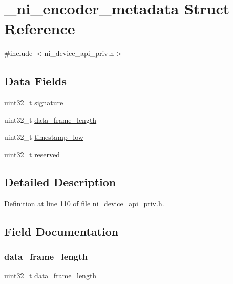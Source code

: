 \hypertarget{struct__ni__encoder__metadata}{}\section{\+\_\+ni\+\_\+encoder\+\_\+metadata Struct Reference}
\label{struct__ni__encoder__metadata}


{\ttfamily \#include $<$ni\+\_\+device\+\_\+api\+\_\+priv.\+h$>$}

\subsection*{Data Fields}
\begin{DoxyCompactItemize}
\item 
uint32\+\_\+t \mbox{\hyperlink{struct__ni__encoder__metadata_acd2a6284879dded65f0b8daa7c68485a}{signature}}
\item 
uint32\+\_\+t \mbox{\hyperlink{struct__ni__encoder__metadata_a77501025896be28cc61fcd4bae9c97d0}{data\+\_\+frame\+\_\+length}}
\item 
uint32\+\_\+t \mbox{\hyperlink{struct__ni__encoder__metadata_a1ff0cbf7cccccf0c09bb61b349702d05}{timestamp\+\_\+low}}
\item 
uint32\+\_\+t \mbox{\hyperlink{struct__ni__encoder__metadata_aa43c4c21b173ada1b6b7568956f0d650}{reserved}}
\end{DoxyCompactItemize}


\subsection{Detailed Description}


Definition at line 110 of file ni\+\_\+device\+\_\+api\+\_\+priv.\+h.



\subsection{Field Documentation}
\mbox{\label{struct__ni__encoder__metadata_a77501025896be28cc61fcd4bae9c97d0}} 
\subsubsection{\texorpdfstring{data\_frame\_length}{data\_frame\_length}}
{\footnotesize\ttfamily uint32\+\_\+t data\+\_\+frame\+\_\+length}



